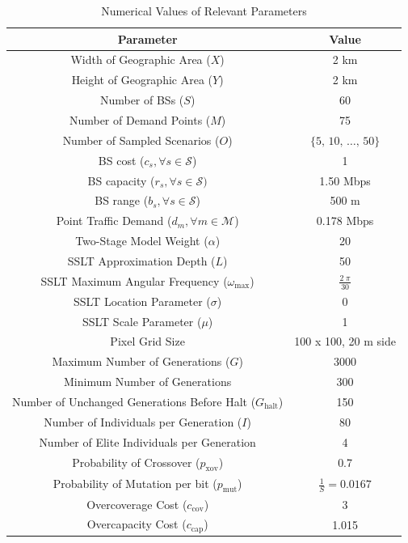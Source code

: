 \documentclass[conference]{IEEEtran}
\begin{document}
\begin{table}[t]
\centering
\caption{Numerical Values of Relevant Parameters}
\begin{tabular}{|c|c|} 
\hline
\textbf{Parameter} & \textbf{Value} \\
\hline
\hline 
Width of Geographic Area ($X$) & 2 km \\
\hline
Height of Geographic Area ($Y$) & 2 km \\
\hline
Number of BSs ($S$) & 60 \\ 
\hline 
Number of Demand Points ($M$) & 75 \\ 
\hline 
Number of Sampled Scenarios ($O$) & $\{5,\, 10,\, \ldots,\, 50\}$ \\ 
\hline 
BS cost ($c_s, \forall s \in \mathcal{S}$) & 1 \\ 
\hline 
BS capacity ($r_s, \forall s \in \mathcal{S})$ & 1.50 Mbps \\ 
\hline
BS range ($b_s, \forall s \in \mathcal{S}$) & 500 m \\
\hline 
Point Traffic Demand ($d_m, \forall m \in \mathcal{M}$) & 0.178 Mbps \\ 
\hline 
Two-Stage Model Weight ($\alpha$) & 20\\ 
\hline 
\hline
SSLT Approximation Depth ($L$) & 50 \\ 
\hline
SSLT Maximum Angular Frequency ($\omega_{\max}$) & $\frac{2 \; \pi}{30}$ \\
\hline 
SSLT Location Parameter ($\sigma$) & 0 \\ 
\hline 
SSLT Scale Parameter ($\mu$) & 1 \\ 
\hline
Pixel Grid Size & 100 x 100, 20 m side\\
\hline 
\hline
Maximum Number of Generations ($G$) & 3000 \\ 
\hline
Minimum Number of Generations & 300 \\
\hline
Number of Unchanged Generations Before Halt ($G_\text{halt}$) & 150 \\
\hline 
Number of Individuals per Generation ($I$) & 80 \\ 
\hline
Number of Elite Individuals per Generation & 4 \\
\hline 
Probability of Crossover ($p_\text{xov}$) & 0.7 \\ 
\hline
Probability of Mutation per bit ($p_\text{mut}$) & $\frac{1}{S} = 0.0167$ \\
\hline 
Overcoverage Cost ($c_\text{cov}$) & 3 \\
\hline
Overcapacity Cost ($c_\text{cap}$) & 1.015 \\
\hline
\end{tabular}
\label{tab:simval}
\end{table}
\end{document}
